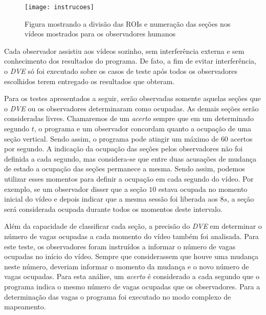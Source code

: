 \begin{figure}
\centering
\texttt{[image: instrucoes]}
\centering
\caption{Figura mostrando a divisão das ROIs e numeração das seções nos vídeos mostrados para os observadores humanos}
\label{fig:instrucao}
\end{figure}

Cada observador assistiu aos vídeos sozinho, sem interferência externa e sem conhecimento dos resultados do programa. De fato, a fim de evitar interferência, o \textit{DVE} só foi executado sobre os casos de teste após todos os observadores escolhidos terem entregado os resultados que obteram.

Para os testes apresentados a seguir, serão observadas somente aquelas seções que o \textit{DVE} ou os observadores determinaram como ocupadas. As demais seções serão consideradas livres. Chamaremos de um \textit{acerto} sempre que em um determinado segundo $t$, o programa e um observador concordam quanto a ocupação de uma seção vertical. Sendo assim, o programa pode atingir um máximo de $60$ acertos por segundo. A indicação da ocupação das seções pelos observadores não foi definida a cada segundo, mas considera-se que entre duas acusações de mudança de estado a ocupação das seções permanece a mesma. Sendo assim, podemos utilizar esses momentos para definir a ocupação em cada segundo do vídeo. Por exemplo, se um observador disser que a seção $10$ estava ocupada no momento inicial do vídeo e depois indicar que a mesma sessão foi liberada aos $8s$, a seção será considerada ocupada durante todos os momentos deste intervalo. 

Além da capacidade de classificar cada seção, a precisão do \textit{DVE} em determinar o número de vagas ocupadas a cada momento do vídeo também foi analisada. Para este teste, os observadores foram instruídos a informar o número de vagas ocupadas no início do vídeo. Sempre que considerassem que houve uma mudança neste número, deveriam informar o momento da mudança e o novo número de vagas ocupadas. Para esta análise, um \textit{acerto} é considerado a cada segundo que o programa indica o mesmo número de vagas ocupadas que os observadores. Para a determinação das vagas o programa foi executado no modo complexo de mapeamento.


